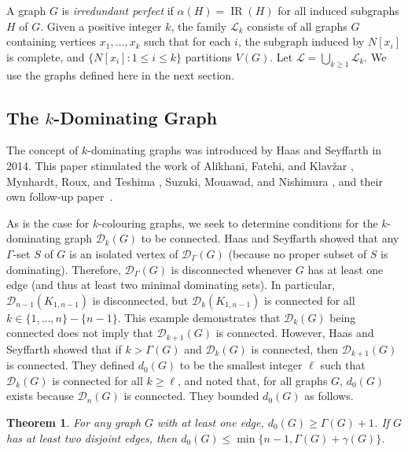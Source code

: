 \documentclass[12pt]{article}%
\newtheorem{theorem}{Theorem}[section]
\begin{document}
A graph $G$ is \emph{irredundant perfect} if $\alpha(H)=\operatorname{IR}(H)$
for all induced subgraphs $H$ of $G$. Given a positive integer $k$, the family
$\mathcal{L}_{k}$ consists of all graphs $G$ containing vertices $x_{1}%
,\dots,x_{k}$ such that for each $i$, the subgraph induced by $N[x_{i}]$ is
complete, and $\{N[x_{i}]:1\leq i\leq k\}$ partitions $V(G)$. Let
$\mathcal{L}=\bigcup_{k\geq1}\mathcal{L}_{k}$. We use the graphs defined here
in the next section.

\subsection{The $k$-Dominating Graph}

\label{Sec_k_Dom}

The concept of $k$-dominating graphs was introduced by Haas and Seyffarth
\cite{26CM-HS2014} in 2014. This paper stimulated the work of Alikhani,
Fatehi, and Klav\v{z}ar \cite{26CM-davood}, Mynhardt, Roux, and Teshima
\cite{26CM-MRT}, Suzuki, Mouawad, and Nishimura \cite{26CM-SMN}, and their own
follow-up paper~\cite{26CM-HS2017}.

As is the case for $k$-colouring graphs, we seek to determine conditions for
the $k$-dominating graph $\mathcal{D}_{k}(G)$ to be connected. Haas and
Seyffarth \cite{26CM-HS2014} showed that any $\Gamma$-set $S$ of $G$ is an
isolated vertex of $\mathcal{D}_{\Gamma}(G)$ (because no proper subset of $S$
is dominating). Therefore, $\mathcal{D}_{\Gamma}(G)$ is disconnected whenever
$G$ has at least one edge (and thus at least two minimal dominating sets). In
particular, $\mathcal{D}_{n-1}(K_{1,n-1})$ is disconnected, but $\mathcal{D}%
_{k}(K_{1,n-1})$ is connected for all $k\in\{1,...,n\}-\{n-1\}$. This example
demonstrates that $\mathcal{D}_{k}(G)$ being connected does not imply that
$\mathcal{D}_{k+1}(G)$ is connected. However, Haas and Seyffarth showed that
if $k>\Gamma(G)$ and $\mathcal{D}_{k}(G)$ is connected, then $\mathcal{D}%
_{k+1}(G)$ is connected. They defined $d_{0}(G)$ to be the smallest integer
$\ell$ such that $\mathcal{D}_{k}(G)$ is connected for all $k\geq\ell$, and
noted that, for all graphs $G$, $d_{0}(G)$ exists because $\mathcal{D}_{n}(G)$
is connected. They bounded $d_{0}(G)$ as follows.

\begin{theorem}
\emph{\cite{26CM-HS2014}}\label{Thm_d0_bound}\hspace{0.1in}For any graph $G$
with at least one edge, $d_{0}(G)\geq\Gamma(G)+1$. If $G$ has at least two
disjoint edges, then $d_{0}(G)\leq\min\{n-1,\Gamma(G)+\gamma(G)\}$.
\end{theorem}
\end{document}

